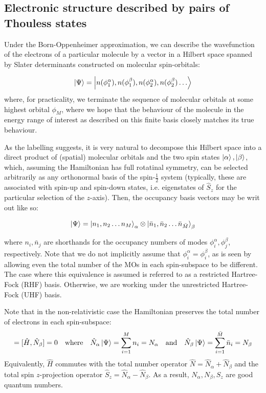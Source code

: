 \documentclass[12pt]{article}
\begin{document}
	\subsection{Electronic structure described by pairs of Thouless states}
	
	Under the Born-Oppenheimer approximation, we can describe the wavefunction of the electrons of a particular molecule by a vector in a Hilbert space spanned by Slater determinants constructed on molecular spin-orbitals:
	
	\begin{equation}
	\ket{\Psi} = \ket{n(\phi_1^\alpha), n(\phi_1^\beta), n(\phi_2^\alpha), n(\phi_2^\beta) \dots}
	\end{equation}
	where, for practicality, we terminate the sequence of molecular orbitals at some highest orbital $\phi_M$, where we hope that the behaviour of the molecule in the energy range of interest as described on this finite basis closely matches its true behaviour.
	
	As the labelling suggests, it is very natural to decompose this Hilbert space into a direct product of (spatial) molecular orbitals and the two spin states $\ket{\alpha}, \ket{\beta}$, which, assuming the Hamiltonian has full rotatinal symmetry, can be selected arbitrarily as any orthonormal basis of the spin-$\frac{1}{2}$ system (typically, these are associated with spin-up and spin-down states, i.e. eigenstates of $\hat{S}_z$ for the particular selection of the $z$-axis). Then, the occupancy basis vectors may be writ out like so:
	
	\begin{equation}
	\ket{\Psi} = \ket{n_1, n_2 \dots n_M}_\alpha \otimes \ket{\bar{n}_1, \bar{n}_2 \dots \bar{n}_{\bar{M}}}_\beta
	\end{equation}
	
	where $n_i, \bar{n}_j$ are shorthands for the occupancy numbers of modes $\phi_i^\alpha, \phi_j^\beta$, respectively. Note that we do not implicitly assume that $\phi_i^\alpha = \phi_i^\beta$, as is seen by allowing even the total number of the MOs in each spin-subspace to be different. The case where this equivalence is assumed is referred to as a restricted Hartree-Fock (RHF) basis. Otherwise, we are working under the unrestricted Hartree-Fock (UHF) basis.
	
	Note that in the non-relativistic case the Hamiltonian preserves the total number of electrons in each spin-subspace:
	\begin{equation}
	[\hat{H}, \hat{N}_\alpha] = [\hat{H}, \hat{N}_\beta] = 0 \qq{where} \hat{N}_\alpha \ket{\Psi} = \sum_{i=1}^M n_i = N_\alpha \qq{and} \hat{N}_\beta \ket{\Psi} = \sum_{i=1}^{\bar{M}} \bar{n}_i = N_\beta
	\end{equation}
	Equivalently, $\hat{H}$ commutes with the total number operator $\hat{N}=\hat{N}_\alpha + \hat{N}_\beta$ and the total spin $z$-projection operator $\hat{S}_z = \hat{N}_\alpha - \hat{N}_\beta$. As a result, $N_\alpha, N_\beta, S_z$ are good quantum numbers.
	
\end{document}
